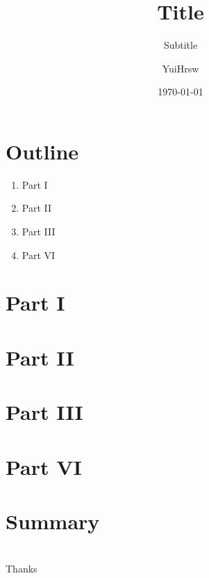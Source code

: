 \documentclass{beamer}
\title[Buttom Title]{Title}
\subtitle{Subtitle}
\date{\today}
\author[Yui]{YuiHrsw}
\institute{yuihrsw@github.com}
\begin{document}
\begin{frame}
    \titlepage
\end{frame}

\section{Outline}

\begin{frame}
    \begin{enumerate}
        \item Part I
        \item Part II
        \item Part III
        \item Part VI
    \end{enumerate}
\end{frame}

\section{Part I}

\section{Part II}

\section{Part III}

\section{Part VI}

\section{Summary}

\section{}

\begin{frame}
    \begin{center}
        {\Huge Thanks}
    \end{center}
\end{frame}
\end{document}
